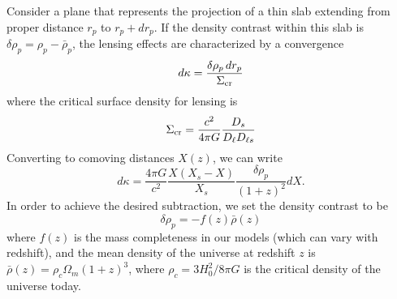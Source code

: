 \documentclass{emulateapj}
\newcommand\drho{\delta\rho}
\newcommand\Sigcrit{\Sigma_{\rm{cr}}}
\begin{document}
Consider a plane that represents the projection of a thin slab extending from proper distance $r_p$ to $r_p + dr_p$.  If the density contrast within this slab is $\drho_p = \rho_p - \bar\rho_p$, the lensing effects are characterized by a convergence
\begin{equation}
  d\kappa = \frac{\drho_p\,dr_p}{\Sigcrit}
\end{equation}
where the critical surface density for lensing is
\begin{equation}
  \Sigcrit = \frac{c^2}{4 \pi G} \frac{D_s}{D_\ell D_{\ell s}}
\end{equation}
Converting to comoving distances $X(z)$, we can write
\begin{equation}\label{eqn:dkappa}
  d\kappa = \frac{4 \pi G}{c^2}\frac{X (X_s - X)}{X_s} \frac{\drho_p}{(1+z)^2} dX.
\end{equation}
In order to achieve the desired subtraction, we set the density contrast to be
\begin{equation}
  \drho_p = -f(z) \bar{\rho}(z) 
\end{equation}
where $f(z)$ is the mass completeness in our models (which can vary with redshift), and the mean density of the universe at redshift $z$ is $\bar{\rho}(z) = \rho_{c} \Omega_m (1 + z)^3$, where $\rho_{c} = 3 H_0^2 / 8 \pi G$ is the critical density of the universe today.
\end{document}
